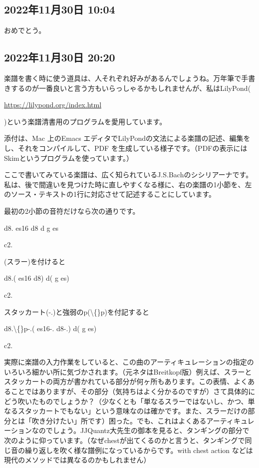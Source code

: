 \documentclass[facebook_diary.tex]{subfiles}
\begin{document}
\subsection*{2022年11月30日 10:04}

おめでとう。

\subsection*{2022年11月30日 20:20}

楽譜を書く時に使う道具は、人それぞれ好みがあるんでしょうね。万年筆で手書きするのが一番良いと言う方もいらっしゃるかもしれませんが、私はLilyPond(

\url{https://lilypond.org/index.html}

)という楽譜清書用のプログラムを愛用しています。


添付は、Mac 上のEmacs エディタでLilyPondの文法による楽譜の記述、編集をし、それをコンパイルして、PDF を生成している様子です。（PDFの表示にはSkimというプログラムを使っています。）

ここで書いてみている楽譜は、広く知られているJ.S.Bachのシシリアーナです。私は、後で間違いを見つけた時に直しやすくなる様に、右の楽譜の1小節を、左のソース・テキストの1行に対応させて記述することにしています。

最初の2小節の音符だけなら次の通りです。


d8. es16 d8 d g es

c2.


(スラー)を付けると


d8.( es16 d8) d( g es)

c2.


スタッカート(-.)と強弱のp(\textbackslash\{\}p)を付記すると


d8.\textbackslash\{\}p-.( es16-. d8-.) d( g es)

c2.


実際に楽譜の入力作業をしていると、この曲のアーティキュレーションの指定のいろいろ細かい所に気づかされます。（元ネタはBreitkopf版）例えば、スラーとスタッカートの両方が書かれている部分が何ヶ所もあります。この表情、よくあることではありますが、その部分（気持ちはよく分かるのですが）さて具体的にどう吹いたものでしょうか？（少なくとも「単なるスラーではないし、かつ、単なるスタッカートでもない」という意味なのは確かです。また、スラーだけの部分とは「吹き分けたい」所です）困った。でも、これはよくあるアーティキュレーションなのでしょう。JJQuantz大先生の御本を見ると、タンギングの部分で次のように仰っています。（なぜchestが出てくるのかと言うと、タンギングで同じ音の繰り返しを吹く様な譜例になっているからです。with chest action などは現代のメソッドでは異なるのかもしれません）
\end{document}
